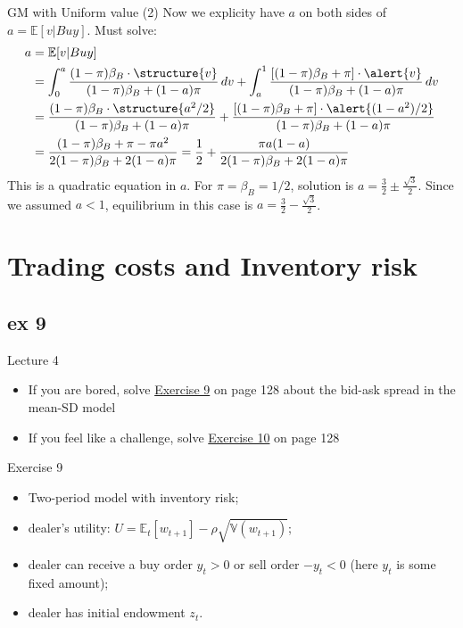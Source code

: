 \documentclass[english,10pt
,aspectratio=169
]{beamer}
\begin{document}
\begin{frame}{GM with Uniform value (2)}
	Now we explicity have $a$ on both sides of $a=\mathbb{E}[v|Buy]$. Must solve:
	\begin{align*}
	a 
	& = \mathbb{E}[v|Buy] \\
	& = \int^{a}_0 \frac{(1-\pi) \beta_B \cdot \structure{v}}{(1-\pi)\beta_B + (1-a) \pi} \, dv + \int^{1}_{a} \frac{[(1-\pi) \beta_B + \pi] \cdot \alert{v}}{(1-\pi)\beta_B + (1-a) \pi} \, dv \\
	& =  \frac{(1-\pi) \beta_B \cdot \structure{a^2/2}}{(1-\pi)\beta_B + (1-a) \pi}+  \frac{[(1-\pi) \beta_B + \pi] \cdot \alert{(1-a^2)/2}}{(1-\pi)\beta_B + (1-a) \pi} \\
	& =  \frac{(1-\pi) \beta_B + \pi -\pi a^2}{2(1-\pi)\beta_B + 2(1-a) \pi} = \frac{1}{2} + \frac{\pi a (1 - a)}{2(1-\pi)\beta_B + 2(1-a) \pi}
	\end{align*}
	This is a quadratic equation in $a$. For $\pi=\beta_B=1/2$, solution is $a=\frac{3}{2} \pm \frac{\sqrt{3}}{2}$. Since we assumed $a<1$, equilibrium in this case  is $a=\frac{3}{2} - \frac{\sqrt{3}}{2}$.
\end{frame}




\section{Trading costs and Inventory risk}
\subsection{ex 9}

\begin{frame}{Lecture 4}
	\begin{itemize}
		\item If you are bored, solve \hyperlink{ex9}{Exercise 9} on page 128 about the bid-ask spread in the mean-SD model
		\item If you feel like a challenge, solve \hyperlink{ex10}{Exercise 10} on page 128
	\end{itemize}
\end{frame}


\begin{frame}[label=ex9]{Exercise 9}
	\begin{itemize}
		\item Two-period model with inventory risk;
		\item dealer's utility: $U = \mathbb{E}_t [w_{t+1}] - \rho \sqrt{\mathbb{V}(w_{t+1})}$;
		\item dealer can receive a buy order $y_t > 0$ or sell order $-y_t < 0$ (here $y_t$ is some fixed amount);
		\item dealer has initial endowment $z_t$.
	\end{itemize}
\end{frame}
\end{document}
